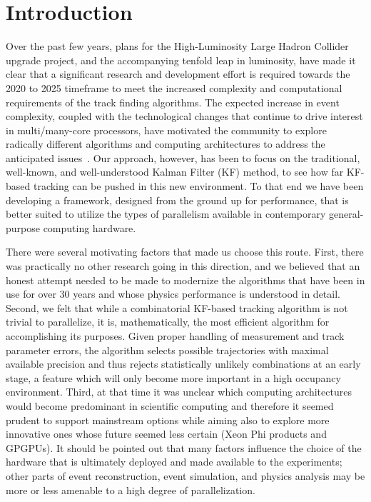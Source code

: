 \documentclass{webofc}
\begin{document}
\maketitle


\section{Introduction}

Over the past few years, plans for the High-Luminosity Large Hadron Collider
upgrade project, and the accompanying tenfold leap in luminosity, have made it
clear that a significant research and development effort is required towards the
2020 to 2025 timeframe to meet the increased complexity and computational
requirements of the track finding algorithms. The expected increase in event
complexity, coupled with the technological changes that continue to drive
interest in multi/many-core processors, have motivated the community to explore
radically different algorithms and computing architectures to address the
anticipated issues~\cite{CTD2018}. Our approach, however, has been to focus on
the traditional, well-known, and well-understood Kalman Filter (KF) method, to
see how far KF-based tracking can be pushed in this new environment. To that
end we have been developing a framework, designed from the ground up for
performance, that is better suited to utilize the types of parallelism available
in contemporary general-purpose computing hardware.

There were several motivating factors that made us choose this route. First,
there was practically no other research going in this direction, and we believed
that an honest attempt needed to be made to modernize the algorithms that have
been in use for over 30 years and whose physics performance is understood in
detail. Second, we felt that while a combinatorial KF-based tracking algorithm
is not trivial to parallelize, it is, mathematically, the most efficient
algorithm for accomplishing its purposes. Given proper handling of measurement
and track parameter errors, the algorithm selects possible trajectories with
maximal available precision and thus rejects statistically unlikely combinations
at an early stage, a feature which will only become more important in a high
occupancy environment. Third, at that time it was unclear which computing
architectures would become predominant in scientific computing and therefore it
seemed prudent to support mainstream options while aiming also to explore more
innovative ones whose future seemed less certain (Xeon Phi products and
GPGPUs). It should be pointed out that many factors influence the choice of the
hardware that is ultimately deployed and made available to the experiments;
other parts of event reconstruction, event simulation, and physics analysis may
be more or less amenable to a high degree of parallelization.
\end{document}
